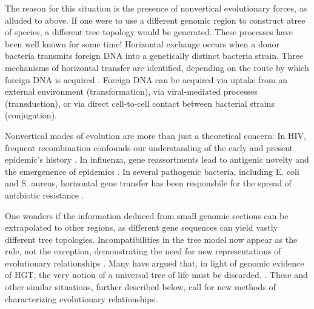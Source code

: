 The reason for this situation is the presence of nonvertical evolutionary forces, as alluded to above.
If one were to use a different genomic region to construct atree of species, a different tree topology would be generated.
These processes have been well known for some time!
Horizontal exchange occurs when a donor bacteria transmits foreign DNA into a genetically distinct bacteria strain.
Three mechanisms of horizontal transfer are identified, depending on the route by which foreign DNA is acquired \cite{Ochman:2000dr}.
Foreign DNA can be acquired via uptake from an external environment (transformation), via viral-mediated processes (transduction), or via direct cell-to-cell contact between bacterial strains (conjugation).



Nonvertical modes of evolution are more than just a theoretical concern:
In HIV, frequent recombination confounds our understanding of the early and present epidemic’s history \kje{[cite]}.
In influenza, gene reassortments lead to antigenic novelty and the emergenence of epidemics \kje{[cite]}.
In several pathogenic bacteria, including E. coli and S. aureus, horizontal gene transfer has been responsbile for the spread of antibiotic resistance \kje{[cite]}.

One wonders if the information deduced from small genomic sections can be extrapolated to other regions, as different gene sequences can yield vastly different tree topologies.
Incompatibilities in the tree model now appear as the rule, not the exception, demonstrating the need for new representations of evolutionary relationships \autocite{Doolittle:1999,Doolittle:2006}.
Many have argued that, in light of genomic evidence of HGT, the very notion of a universal tree of life must be discarded. .
These and other similar situations, further described below, call for new methods of characterizing evolutionary relationships.

